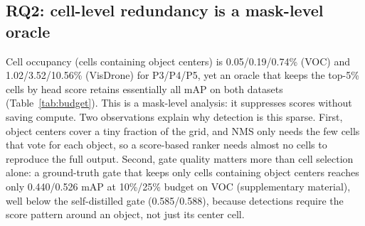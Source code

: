 \documentclass[times,twocolumn,final,authoryear]{elsarticle}
\begin{document}
\subsection{RQ2: cell-level redundancy is a mask-level oracle}
Cell occupancy (cells containing object centers) is 0.05/0.19/0.74\% (VOC) and 1.02/3.52/10.56\% (VisDrone) for P3/P4/P5, yet an oracle that keeps the top-5\% cells by head score retains essentially all mAP on both datasets (Table~\ref{tab:budget}). This is a mask-level analysis: it suppresses scores without saving compute. Two observations explain why detection is this sparse. First, object centers cover a tiny fraction of the grid, and NMS only needs the few cells that vote for each object, so a score-based ranker needs almost no cells to reproduce the full output. Second, gate quality matters more than cell selection alone: a ground-truth gate that keeps only cells containing object centers reaches only 0.440/0.526 mAP at 10\%/25\% budget on VOC (supplementary material), well below the self-distilled gate (0.585/0.588), because detections require the score pattern around an object, not just its center cell.
\begin{table}[h]\centering\footnotesize
\caption{Budget curves (mAP50-95, mask-level): an oracle ranking cells by the model's own head scores retains essentially all mAP at 5\% of cells; the self-distilled gate is within 0.5\,pp of full accuracy at 10\% budget (VOC: 0.5852 vs.\ 0.5899; VisDrone: 0.1719 vs.\ 0.1725) and 1.1\,pp at 5\%; the energy gate degrades much more on dense VisDrone. Full 5--75\% curves and YOLO26s/26m ablations are in the supplementary material; these numbers assume full features (real skipping: Table~\ref{tab:blockskip}).}
\label{tab:budget}

\end{table}
\end{document}
